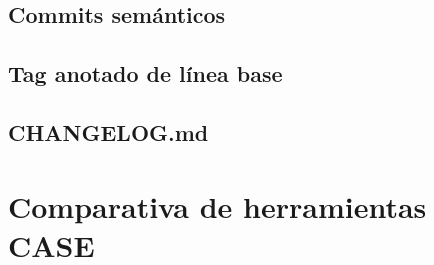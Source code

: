 \documentclass[journal,onecolumn]{IEEEtran}
\newcommand{\guia}[2]{%
	\begin{mdframed}[style=guia]
		\sloppy
		\noindent\textbf{Responsable: #1}\\[2pt]
		#2
	\end{mdframed}
}
\newif\ifguias
\let\guiaoriginal\guia
\renewcommand{\guia}[2]{\ifguias\guiaoriginal{#1}{#2}\fi}
\begin{document}
	\subsection{Commits semánticos}
	
	\subsection{Tag anotado de línea base}
	
	\subsection{CHANGELOG.md}
	
	\guia{Edson (Integrante 1)}{%
		Sección completa a cargo del coordinador. Contenido por subsección: (8.1)~URL, estructura de
		carpetas y contenido del \texttt{README.md}; (8.2)~tabla o captura de
		\texttt{git log --oneline --graph --decorate}; (8.3)~comandos ejecutados y captura de
		\texttt{git tag -n} y de la pestaña de tags en GitHub; (8.4)~contenido del CHANGELOG.\\[3pt]
		Puntos que la rúbrica revisa uno a uno:
		(i)~repositorio \textbf{público} con la estructura convenida;
		(ii)~$\geq 8$ commits \textbf{distribuidos en el tiempo} y con autoría de los tres ---
		un único commit de carga masiva al cierre baja C5 a nivel 2 y contradice A3;
		(iii)~tag \textbf{anotado y publicado} (\texttt{git push origin baseline-v1.1}) ---
		el tag creado solo en local es el error frecuente número uno;
		(iv)~\texttt{README.md} con las \textbf{instrucciones de compilación} (compilador, orden de
		comandos, archivo principal y dependencias): sin esto se activa G2 y la nota es CERO.\\[3pt]
		Orden de compilación a documentar en el README:
		\texttt{pdflatex} $\rightarrow$ \texttt{biber} $\rightarrow$ \texttt{pdflatex} $\rightarrow$
		\texttt{pdflatex}, archivo principal \texttt{PE4\_U4\_FUERTES\_CONTRERAS.tex}, dependencias
		\texttt{referencias.bib} y la carpeta \texttt{figuras/} (incluye \texttt{logo\_uteq.png}).\\[3pt]
		\textbf{Prueba obligatoria antes de entregar:} clonar el repositorio en una carpeta limpia y
		compilar desde cero siguiendo el propio README. Si falla ahí, falla en la revisión.}
	
	\section{Comparativa de herramientas CASE}
	
\end{document}

